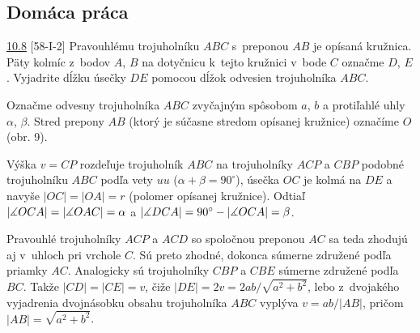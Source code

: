 \subsection*{Domáca práca}
\begin{tcolorbox}[breakable,notitle,boxrule=0pt,colback=light-gray,colframe=light-gray]\ul{10.8} [58-I-2] Pravouhlému trojuholníku $ABC$ s~preponou $AB$ je opísaná kružnica. Päty kolmíc z~bodov $A$, $B$ na dotyčnicu k~tejto kružnici v~bode $C$ označme $D$, $E$. Vyjadrite dĺžku úsečky $DE$ pomocou dĺžok odvesien trojuholníka $ABC$.

\end{tcolorbox}

\rieh Označme odvesny trojuholníka $ABC$ zvyčajným spôsobom $a$, $b$ a protiľahlé uhly $\alpha$, $\beta$. Stred prepony $AB$ (ktorý je súčasne stredom opísanej kružnice) označíme $O$ (obr. 9).

Výška $v = CP$ rozdeľuje trojuholník $ABC$ na trojuholníky $ACP$ a $CBP$ podobné trojuholníku $ABC$ podľa vety $uu$ ($\alpha + \beta = 90^\circ$), úsečka $OC$ je kolmá na $DE$ a navyše $|OC| = |OA| = r$ (polomer opísanej kružnice). Odtiaľ $|\measuredangle OCA| = |\measuredangle OAC| = \alpha$ a $|\measuredangle DCA| = 90^\circ - |\measuredangle OCA| = \beta$.

Pravouhlé trojuholníky $ACP$ a $ACD$ so spoločnou preponou $AC$ sa teda zhodujú aj v~uhloch pri vrchole $C$. Sú preto zhodné, dokonca súmerne združené podľa priamky $AC$. Analogicky sú trojuholníky $CBP$ a $CBE$ súmerne združené podľa $BC$. Takže $|CD|= |CE| = v$, čiže $|DE| = 2v = 2ab/\sqrt{a^2 + b^2}$, lebo z~dvojakého vyjadrenia dvojnásobku obsahu trojuholníka $ABC$ vyplýva $v = ab/|AB|$, pričom $|AB| =\sqrt{a^2 + b^2}$.

